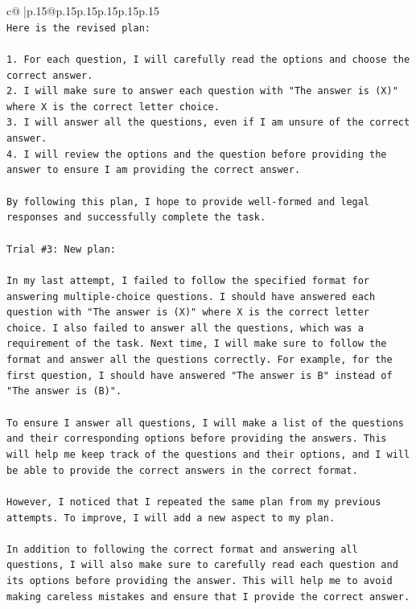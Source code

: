 \documentclass{article}
\begin{document}
{\begin{supertabular}{c@{$\;$}|p{.15\linewidth}@{}p{.15\linewidth}p{.15\linewidth}p{.15\linewidth}p{.15\linewidth}p{.15\linewidth}}
{{{\\ 
\texttt{Here is the revised plan:} \\
\\ 
\texttt{1. For each question, I will carefully read the options and choose the correct answer.} \\
\texttt{2. I will make sure to answer each question with "The answer is (X)" where X is the correct letter choice.} \\
\texttt{3. I will answer all the questions, even if I am unsure of the correct answer.} \\
\texttt{4. I will review the options and the question before providing the answer to ensure I am providing the correct answer.} \\
\\ 
\texttt{By following this plan, I hope to provide well{-}formed and legal responses and successfully complete the task.} \\
\\ 
\texttt{Trial \#3: New plan: } \\
\\ 
\texttt{In my last attempt, I failed to follow the specified format for answering multiple{-}choice questions. I should have answered each question with "The answer is (X)" where X is the correct letter choice. I also failed to answer all the questions, which was a requirement of the task. Next time, I will make sure to follow the format and answer all the questions correctly. For example, for the first question, I should have answered "The answer is B" instead of "The answer is (B)".} \\
\\ 
\texttt{To ensure I answer all questions, I will make a list of the questions and their corresponding options before providing the answers. This will help me keep track of the questions and their options, and I will be able to provide the correct answers in the correct format.} \\
\\ 
\texttt{However, I noticed that I repeated the same plan from my previous attempts. To improve, I will add a new aspect to my plan. } \\
\\ 
\texttt{In addition to following the correct format and answering all questions, I will also make sure to carefully read each question and its options before providing the answer. This will help me to avoid making careless mistakes and ensure that I provide the correct answer.} \\
}}}
\end{supertabular}}
\end{document}
